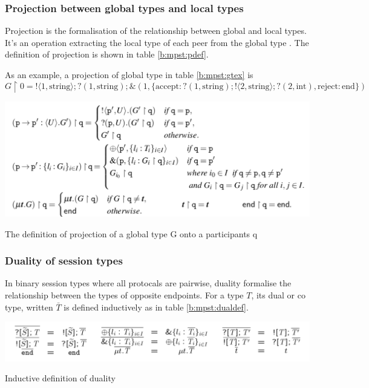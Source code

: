 \subsubsection{Projection between global types and local types} \label{b:mpst:proj}
Projection is the formalisation of the relationship between global and local types. It's an operation extracting the local type of each peer from the global type \cite{coppoGentleIntroductionMultiparty2015}. The definition of projection is shown in table \ref{b:mpst:pdef}.

As an example, a projection of global type in table \ref{b:mpst:gtex} is
$$
  G \upharpoonright 0 = !\langle 1, \text{string} \rangle;?(1, \text{string});\&(1, \{ \text{accept}: ?(1, \text{string});!\langle 2, \text{string} \rangle;?(2, \text{int}), 
  \text{reject}: \text{end} \})
$$  
\begin{table}[H]
\includegraphics[width=\textwidth]{background/image/proj-def.png}
\caption{The definition of projection of a global type G onto a participants q\cite{coppoGentleIntroductionMultiparty2015}}
\label{b:mpst:pdef}
\end{table}
\subsubsection{Duality of session types}
In binary session types where all protocals are pairwise, duality formalise the relationship between the types of opposite endpoints. For a type $T$, its dual or co type, written $\bar{T}$ is defined inductively as in table \ref{b:mpst:dualdef}.
\begin{table}[H]
\includegraphics[width=\textwidth]{background/image/dual-def.png}
\caption{Inductive definition of duality}
\label{b:mpst:dualdef}
\end{table}


